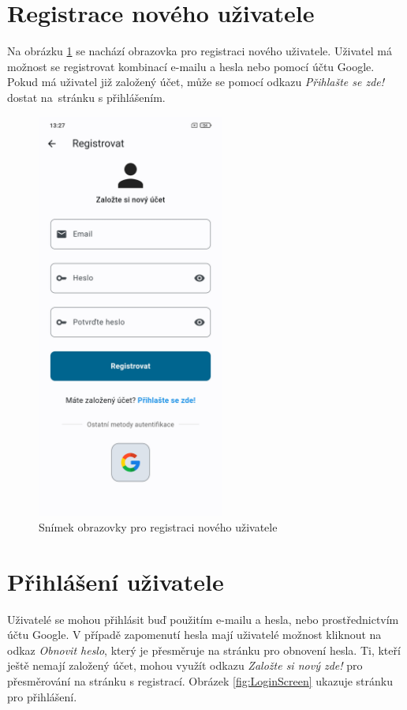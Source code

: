 \documentclass[czech, bc, kiv, he, iso690numb]{fasthesis}
\begin{document}
\newpage

\section{Registrace nového uživatele}

Na obrázku \ref{fig:RegisterScreen} se nachází obrazovka pro registraci nového uživatele. Uživatel má možnost se registrovat kombinací e-mailu a hesla nebo pomocí účtu Google. Pokud má uživatel již založený účet, může se pomocí odkazu \textit{Přihlašte se zde!} dostat na~stránku s přihlášením.

\begin{figure}[h!]
  \centering
  \includegraphics[width=0.55\textwidth]{img/BP-Runt/UserManual/Registration.jpg}
  \caption{Snímek obrazovky pro registraci nového uživatele}
  \label{fig:RegisterScreen}
\end{figure}

\section{Přihlášení uživatele}
Uživatelé se mohou přihlásit buď použitím e-mailu a hesla, nebo prostřednictvím účtu Google. V případě zapomenutí hesla mají uživatelé možnost kliknout na odkaz \textit{Obnovit heslo}, který je přesměruje na stránku pro obnovení hesla. Ti, kteří ještě nemají založený účet, mohou využít odkazu \textit{Založte si nový zde!} pro přesměrování na stránku s registrací. Obrázek \ref{fig:LoginScreen} ukazuje stránku pro přihlášení.
 
\end{document}
